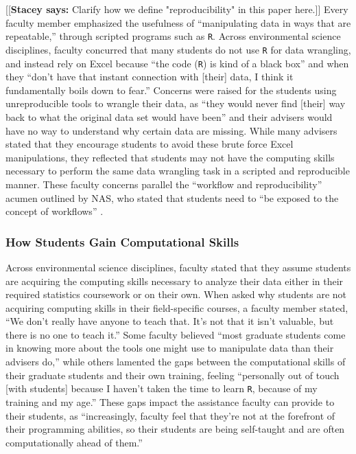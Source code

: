 \documentclass[12pt]{article}
\newcommand{\stacey}[1]{{\color{purple}[[\textbf{Stacey says: }#1]]}}
\begin{document}
\stacey{Clarify how we define "reproducibility" in this paper here.}
\quad Every faculty member emphasized the usefulness of ``manipulating data in
ways that are repeatable,'' through scripted programs such as \texttt{R}. Across
environmental science disciplines, faculty concurred that many students do not
use \texttt{R} for data wrangling, and instead rely on Excel because ``the code
(\texttt{R}) is kind of a black box'' and when they ``don't have that instant
connection with [their] data, I think it fundamentally boils down to fear.'' 
Concerns were raised for the students using unreproducible tools to wrangle
their data, as ``they would never find [their] way back to what the original
data set would have been'' and their advisers would have no way to understand
why certain data are missing. While many advisers stated that they encourage
students to avoid these brute force Excel manipulations, they reflected that 
students may not have the computing skills necessary to perform the same data
wrangling task in a scripted and reproducible manner. These faculty concerns
parallel the ``workflow and reproducibility'' acumen outlined by NAS, who stated
that students need to ``be exposed to the concept of workflows'' 
\citep[p.\ 28]{nas}. 

\subsubsection{How Students Gain Computational Skills}

\quad Across environmental science disciplines, faculty stated that they 
assume students are acquiring the computing skills necessary to analyze their 
data either in their required statistics coursework or on their own. When asked
why students are not acquiring computing skills in their field-specific courses,
a faculty member stated, ``We don't really have anyone to teach that. It's not
that it isn't valuable, but there is no one to teach it.'' Some faculty believed
``most graduate students come in knowing more about the tools one might use to
manipulate data than their advisers do,'' while others lamented the gaps between
the computational skills of their graduate students and their own training,
feeling ``personally out of touch [with students] because I haven't taken the
time to learn \texttt{R}, because of my training and my age.'' These gaps impact
the assistance faculty can provide to their students, as ``increasingly, faculty
feel that they're not at the forefront of their programming abilities, so their
students are being self-taught and are often computationally ahead of them.''
\end{document}
